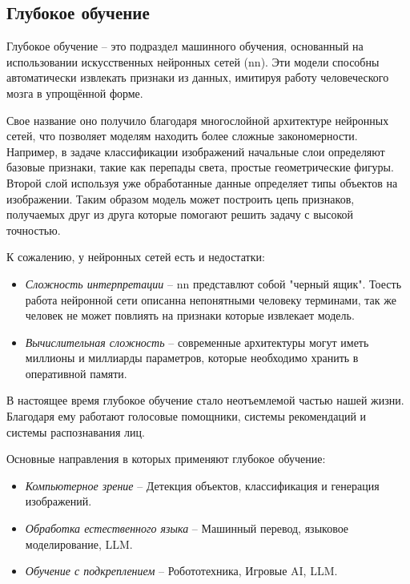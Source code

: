\documentclass[../part_1.tex]{subfiles}
\begin{document}
\subsection{Глубокое обучение}
\par Глубокое обучение -- это подраздел машинного обучения, основанный на использовании искусственных нейронных сетей (\acrshort{nn}). Эти модели способны автоматически извлекать признаки из данных, имитируя работу человеческого мозга в упрощённой форме.
\par Свое название оно получило благодаря многослойной архитектуре нейронных сетей, что позволяет моделям находить более сложные закономерности. Например, в задаче классификации изображений начальные слои определяют базовые признаки, такие как перепады света, простые геометрические фигуры. Второй слой используя уже обработанные данные определяет типы объектов на изображении. Таким образом модель может построить цепь признаков, получаемых друг из друга которые помогают решить задачу с высокой точностью.
\par К сожалению, у нейронных сетей есть и недостатки:
\begin{itemize}
    \item \textit{Сложность интерпретации} -- \acrshort{nn} представлют собой "черный ящик". Тоесть работа нейронной сети описанна непонятными человеку терминами, так же человек не может повлиять на признаки которые извлекает модель.
    \item \textit{Вычислительная сложность} -- современные архитектуры могут иметь миллионы и миллиарды параметров, которые необходимо хранить в оперативной памяти.
\end{itemize}
\par В настоящее время глубокое обучение стало неотъемлемой частью нашей жизни. Благодаря ему работают голосовые помощники, системы рекомендаций и системы распознавания лиц.
\par Основные направления в которых применяют глубокое обучение:
\begin{itemize}
    \item \textit{Компьютерное зрение} -- Детекция объектов, классификация и генерация изображений.
    \item \textit{Обработка естественного языка} -- Машинный перевод, языковое моделирование, LLM.
    \item \textit{Обучение с подкреплением} -- Робототехника, Игровые AI, LLM.
\end{itemize}
\end{document}
